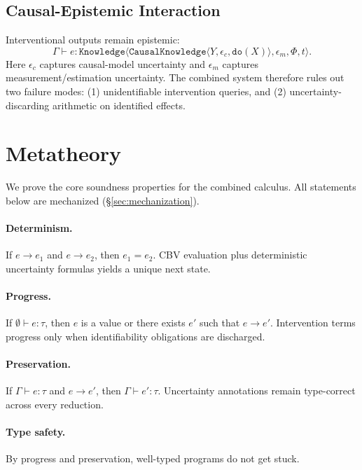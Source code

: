 \documentclass[acmsmall,screen,review,anonymous]{acmart}
\newcommand{\knowfull}[4]{\texttt{Knowledge}\langle #1, #2, #3, #4 \rangle}
\newcommand{\cknow}[3]{\texttt{CausalKnowledge}\langle #1, #2, #3 \rangle}
\newcommand{\eps}{\epsilon}
\begin{document}
\subsection{Causal-Epistemic Interaction}

Interventional outputs remain epistemic:
\[
\Gamma \vdash e : \knowfull{\cknow{Y}{\eps_c}{\texttt{do}(X)}}{\eps_m}{\Phi}{t}.
\]
Here $\eps_c$ captures causal-model uncertainty and $\eps_m$ captures
measurement/estimation uncertainty.
The combined system therefore rules out two failure modes:
(1) unidentifiable intervention queries, and
(2) uncertainty-discarding arithmetic on identified effects.

\section{Metatheory}
\label{sec:metatheory}

We prove the core soundness properties for the combined calculus.
All statements below are mechanized (\S\ref{sec:mechanization}).

\paragraph{Determinism.}
If $e \to e_1$ and $e \to e_2$, then $e_1 = e_2$.
CBV evaluation plus deterministic uncertainty formulas yields a unique
next state.

\paragraph{Progress.}
If $\emptyset \vdash e : \tau$, then $e$ is a value or there exists
$e'$ such that $e \to e'$.
Intervention terms progress only when identifiability obligations are
discharged.

\paragraph{Preservation.}
If $\Gamma \vdash e : \tau$ and $e \to e'$, then
$\Gamma \vdash e' : \tau$.
Uncertainty annotations remain type-correct across every reduction.

\paragraph{Type safety.}
By progress and preservation, well-typed programs do not get stuck.
\end{document}
